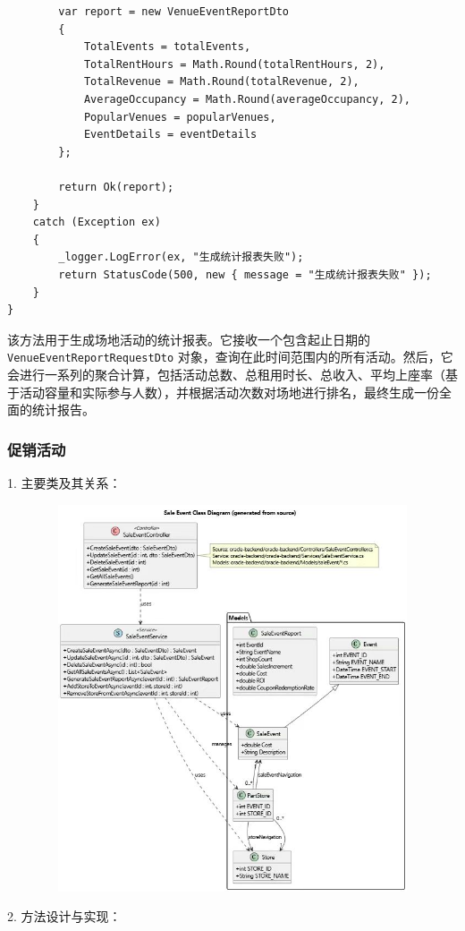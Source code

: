 \documentclass[]{article}
\let\oldincludegraphics\includegraphics
\renewcommand{\includegraphics}[2][]{%
  \begin{center}\oldincludegraphics[#1]{#2}\end{center}%
}
\begin{document}
\begin{verbatim}
        var report = new VenueEventReportDto
        {
            TotalEvents = totalEvents,
            TotalRentHours = Math.Round(totalRentHours, 2),
            TotalRevenue = Math.Round(totalRevenue, 2),
            AverageOccupancy = Math.Round(averageOccupancy, 2),
            PopularVenues = popularVenues,
            EventDetails = eventDetails
        };

        return Ok(report);
    }
    catch (Exception ex)
    {
        _logger.LogError(ex, "生成统计报表失败");
        return StatusCode(500, new { message = "生成统计报表失败" });
    }
}
\end{verbatim}
该方法用于生成场地活动的统计报表。它接收一个包含起止日期的 \texttt{VenueEventReportRequestDto} 对象，查询在此时间范围内的所有活动。然后，它会进行一系列的聚合计算，包括活动总数、总租用时长、总收入、平均上座率（基于活动容量和实际参与人数），并根据活动次数对场地进行排名，最终生成一份全面的统计报告。

\subsubsection{促销活动}

1. 主要类及其关系：

\includegraphics[width=6.2in,height=4.5in]{media/2.5/uml2.jpg} %

2. 方法设计与实现：
\end{document}
